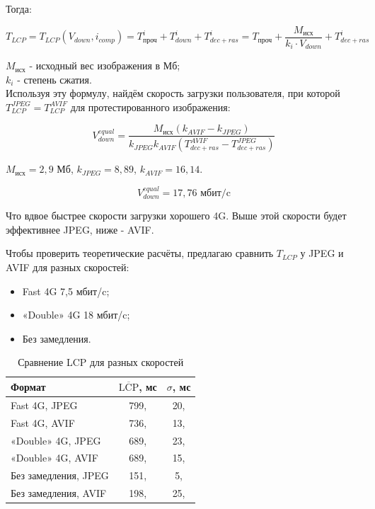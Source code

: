 \documentclass[12pt]{article}
\begin{document}
Тогда:

\[
    T_{LCP} = T_{LCP}(V_{down}, i_{comp}) = T^{i}_{\text{проч}} + T^{i}_{down} + T^{i}_{dec+ras} = T_{\text{проч}} + \frac{M_{\text{исх}}}{k_{i} \cdot V_{down}} + T^{i}_{dec+ras}
\]

$M_{\text{исх}}$ - исходный вес изображения в Мб; \\
$k_i$ - степень сжатия. \\

Используя эту формулу, найдём скорость загрузки пользователя, при которой $T^{JPEG}_{LCP} = T^{AVIF}_{LCP}$ для протестированного изображения:

\begin{equation}
    V^{equal}_{down} = \frac{M_{\text{исх}}(k_{AVIF} - k_{JPEG})}{k_{JPEG}k_{AVIF}(T^{AVIF}_{dec+ras} - T^{JPEG}_{dec+ras})}
\end{equation}

$M_{\text{исх}} = 2{,}9\text{ Мб}$, $k_{JPEG} = 8{,}89$, $k_{AVIF} = 16{,}14$.

\[
    V^{equal}_{down} = 17{,}76 \text{ мбит/c}
\]

Что вдвое быстрее скорости загрузки хорошего 4G.
Выше этой скорости будет эффективнее JPEG, ниже - AVIF.

Чтобы проверить теоретические расчёты, предлагаю сравнить $T_{LCP}$ у JPEG
и AVIF для разных скоростей:

\begin{itemize}
    \item Fast 4G 7{,}5 мбит/c;
    \item «Double» 4G 18 мбит/c;
    \item Без замедления.
\end{itemize}

\begin{table}[H]
    \centering
    \caption{Сравнение LCP для разных скоростей}
    \begin{tabular}{l S[table-format=3.2] S[table-format=2.2]}
        \toprule
        Формат               & {$\overline{\text{LCP}}$, мс} & {$\sigma$, мс} \\
        \midrule
        Fast 4G, JPEG        & 799,                          & 20,            \\
        Fast 4G, AVIF        & 736,                          & 13,            \\
        «Double» 4G, JPEG    & 689,                          & 23,            \\
        «Double» 4G, AVIF    & 689,                          & 15,            \\
        Без замедления, JPEG & 151,                          & 5,             \\
        Без замедления, AVIF & 198,                          & 25,            \\
        \bottomrule
    \end{tabular}
\end{table}
\end{document}

